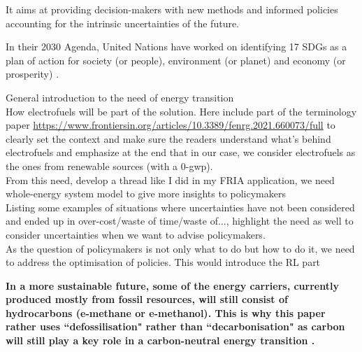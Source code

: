 It aims at providing decision-makers with new methods and informed policies accounting for the intrinsic uncertainties of the future. 




In their 2030 Agenda, United Nations have worked on identifying 17 \gls{SDGs} as a plan of action for society (or people), environment (or planet) and economy (or prosperity) \cite{un_sdgs}. 
%
%

General introduction to the need of energy transition\\

How electrofuels will be part of the solution. Here include part of the terminology paper \url{https://www.frontiersin.org/articles/10.3389/fenrg.2021.660073/full} to clearly set the context and make sure the readers understand what's behind electrofuels and emphasize at the end that in our case, we consider electrofuels as the ones from renewable sources (with a 0-gwp).\\

From this need, develop a thread like I did in my FRIA application, we need whole-energy system model to give more insights to policymakers\\

Listing some examples of situations where uncertainties have not been considered and ended up in over-cost/waste of time/waste of..., highlight the need as well to consider uncertainties when we want to advise policymakers.\\

As the question of policymakers is not only what to do but how to do it, we need to address the optimisation of policies. This would introduce the RL part


\textbf{In a more sustainable future, some of the energy carriers, currently produced mostly from fossil resources, will still consist of hydrocarbons (\eg e-methane or e-methanol). This is why this paper rather uses ``defossilisation" rather than ``decarbonisation" as carbon will still play a key role in a carbon-neutral energy transition \cite{mertens2020carbon}.}



